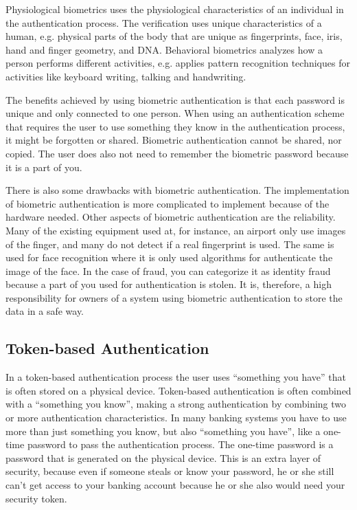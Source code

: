     Physiological biometrics uses the physiological characteristics of an individual in the authentication process. The verification uses unique characteristics of a human, e.g. physical parts of the body that are unique as fingerprints, face, iris, hand and finger geometry, and DNA. Behavioral biometrics analyzes how a person performs different activities, e.g. applies pattern recognition techniques for activities like keyboard writing, talking and handwriting.

    The benefits achieved by using biometric authentication is that each password is unique and only connected to one person. When using an authentication scheme that requires the user to use something they know in the authentication process, it might be forgotten or shared. Biometric authentication cannot be shared, nor copied. The user does also not need to remember the biometric password because it is a part of you.

    There is also some drawbacks with biometric authentication. The implementation of biometric authentication is more complicated to implement because of the hardware needed. Other aspects of biometric authentication are the reliability. Many of the existing equipment used at, for instance, an airport only use images of the finger, and many do not detect if a real fingerprint is used. The same is used for face recognition where it is only used algorithms for authenticate the image of the face. In the case of fraud, you can categorize it as identity fraud because a part of you used for authentication is stolen. It is, therefore, a high responsibility for owners of a system using biometric authentication to store the data in a safe way.

    \subsection{Token-based Authentication}
    In a token-based authentication process the user uses ``something you have'' that is often stored on a physical device. Token-based authentication is often combined with a ``something you know'', making a strong authentication by combining two or more authentication characteristics. In many banking systems you have to use more than just something you know, but also ``something you have'', like a one-time password to pass the authentication process. The one-time password is a password that is generated on the physical device. This is an extra layer of security, because even if someone steals or know your password, he or she still can't get access to your banking account because he or she also would need your security token.

